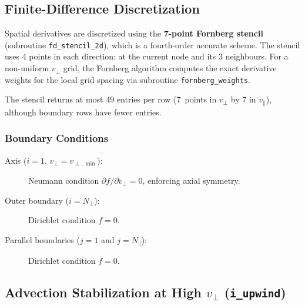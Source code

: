 \documentclass[11pt,a4paper]{article}
\newcommand{\vp}{v_\perp}
\newcommand{\vpa}{v_\parallel}
\newcommand{\vpmin}{v_{\perp,\min}}
\begin{document}
\subsection{Finite-Difference Discretization}

Spatial derivatives are discretized using the \textbf{7-point Fornberg
stencil} (subroutine \texttt{fd\_stencil\_2d}), which is a fourth-order
accurate scheme.  The stencil uses 4 points in each direction: at the current
node and its 3 neighbours.  For a non-uniform $\vp$ grid, the Fornberg
algorithm computes the exact derivative weights for the local grid spacing via
subroutine \texttt{fornberg\_weights}.

The stencil returns at most 49 entries per row (7~points in $\vp$ by 7 in
$\vpa$), although boundary rows have fewer entries.

\subsubsection{Boundary Conditions}

\begin{description}
  \item[Axis ($i=1$, $\vp=\vpmin$):] Neumann condition $\partial f/\partial\vp = 0$,
        enforcing axial symmetry.

  \item[Outer boundary ($i=N_\perp$):] Dirichlet condition $f = 0$.

  \item[Parallel boundaries ($j=1$ and $j=N_\parallel$):] Dirichlet condition $f = 0$.
\end{description}

\subsection{Advection Stabilization at High $\vp$ (\texttt{i\_upwind})}
\label{sec:upwind}
\end{document}
